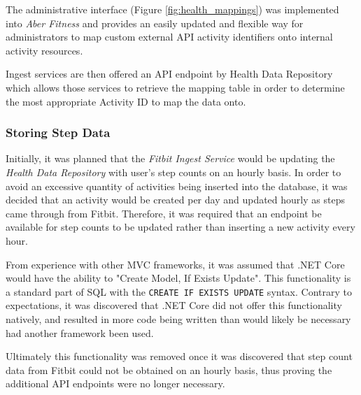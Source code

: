 The administrative interface (Figure \ref{fig:health_mappings}) was implemented into \textit{Aber Fitness} and provides an easily updated and flexible way for administrators to map custom external API activity identifiers onto internal activity resources. 

Ingest services are then offered an API endpoint by Health Data Repository which allows those services to retrieve the mapping table in order to determine the most appropriate Activity ID to map the data onto.

\subsubsection{Storing Step Data}
Initially, it was planned that the \textit{Fitbit Ingest Service} would be updating the \textit{Health Data Repository} with user's step counts on an hourly basis. In order to avoid an excessive quantity of activities being inserted into the database, it was decided that an activity would be created per day and updated hourly as steps came through from Fitbit. Therefore, it was required that an endpoint be available for step counts to be updated rather than inserting a new activity every hour. 

From experience with other MVC frameworks, it was assumed that .NET Core would have the ability to "Create Model, If Exists Update". This functionality is a standard part of SQL with the \lstinline{CREATE IF EXISTS UPDATE} syntax. Contrary to expectations, it was discovered that .NET Core did not offer this functionality natively, and resulted in more code being written than would likely be necessary had another framework been used. 

Ultimately this functionality was removed once it was discovered that step count data from Fitbit could not be obtained on an hourly basis, thus proving the additional API endpoints were no longer necessary. 
